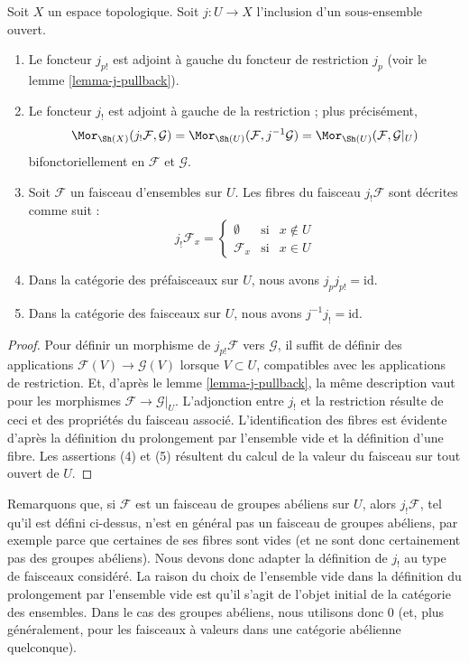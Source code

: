 \begin{lemma}
\label{lemma-j-shriek}
Soit $X$ un espace topologique.
Soit $j : U \to X$ l'inclusion d'un sous-ensemble ouvert.
\begin{enumerate}
\item Le foncteur $j_{p!}$ est adjoint à gauche du
foncteur de restriction $j_p$ (voir le lemme \ref{lemma-j-pullback}).
\item Le foncteur $j_!$ est adjoint à gauche de la restriction ;
plus précisément,
$$
\Mor_{\Sh(X)}(j_!\mathcal{F}, \mathcal{G})
=
\Mor_{\Sh(U)}(\mathcal{F}, j^{-1}\mathcal{G})
=
\Mor_{\Sh(U)}(\mathcal{F}, \mathcal{G}|_U)
$$
bifonctoriellement en $\mathcal{F}$ et $\mathcal{G}$.
\item Soit $\mathcal{F}$ un faisceau d'ensembles sur $U$.
Les fibres du faisceau $j_!\mathcal{F}$ sont décrites
comme suit :
$$
j_{!}\mathcal{F}_x =
\left\{
\begin{matrix}
\emptyset & \text{si} & x \not \in U \\
\mathcal{F}_x & \text{si} & x \in U
\end{matrix}
\right.
$$
\item Dans la catégorie des préfaisceaux sur $U$, nous avons $j_pj_{p!} = \text{id}$.
\item Dans la catégorie des faisceaux sur $U$, nous avons $j^{-1}j_! = \text{id}$.
\end{enumerate}
\end{lemma}

\begin{proof}
Pour définir un morphisme de $j_{p!}\mathcal{F}$ vers $\mathcal{G}$,
il suffit de définir des applications $\mathcal{F}(V) \to \mathcal{G}(V)$
lorsque $V \subset U$, compatibles avec les applications
de restriction. Et, d'après le lemme \ref{lemma-j-pullback},
la même description vaut pour les morphismes
$\mathcal{F} \to \mathcal{G}|_U$.
L'adjonction entre $j_!$ et la restriction résulte
de ceci et des propriétés du faisceau associé.
L'identification des fibres est évidente d'après la
définition du prolongement par l'ensemble vide
et la définition d'une fibre.
Les assertions (4) et (5) résultent du calcul de la
valeur du faisceau sur tout ouvert de $U$.
\end{proof}

\noindent
Remarquons que, si $\mathcal{F}$ est un faisceau
de groupes abéliens sur $U$, alors $j_!\mathcal{F}$, tel qu'il est
défini ci-dessus, n'est en général pas un faisceau de groupes abéliens, par exemple
parce que certaines de ses fibres sont vides (et ne sont donc certainement pas
des groupes abéliens). Nous devons donc adapter la définition de
$j_!$ au type de faisceaux considéré.
La raison du choix de l'ensemble vide dans la définition du
prolongement par l'ensemble vide est qu'il s'agit de l'objet initial
de la catégorie des ensembles. Dans le cas des groupes abéliens,
nous utilisons donc $0$ (et, plus généralement, pour les faisceaux à valeurs dans
une catégorie abélienne quelconque).


